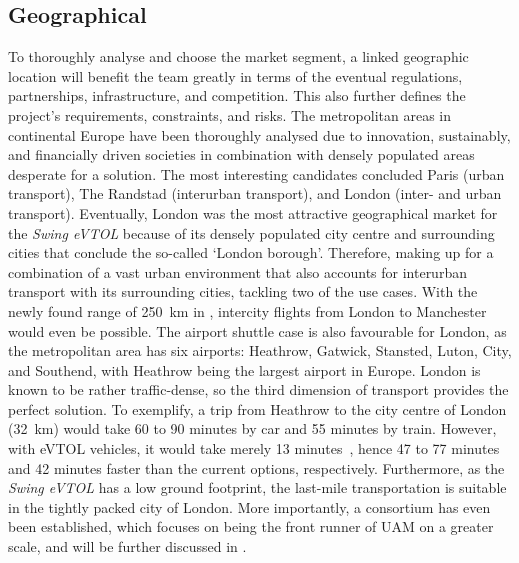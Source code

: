 \subsection*{Geographical}
To thoroughly analyse and choose the market segment, a linked geographic location will benefit the team greatly in terms of the eventual regulations, partnerships, infrastructure, and competition.
This also further defines the project's requirements, constraints, and risks.
The metropolitan areas in continental Europe have been thoroughly analysed due to innovation, sustainably, and financially driven societies in combination with densely populated areas desperate for a solution.
The most interesting candidates concluded Paris (urban transport), The Randstad (interurban transport), and London (inter- and urban transport).
Eventually, London was the most attractive geographical market for the \textit{Swing eVTOL} because of its densely populated city centre and surrounding cities that conclude the so-called \enquote*{London borough}.
Therefore, making up for a combination of a vast urban environment that also accounts for interurban transport with its surrounding cities, tackling two of the use cases.
With the newly found range of \qty{250}{\km} in , intercity flights from London to Manchester would even be possible.
The airport shuttle case is also favourable for London, as the metropolitan area has six airports: Heathrow, Gatwick, Stansted, Luton, City, and Southend, with Heathrow being the largest airport in Europe.
London is known to be rather traffic-dense, so the third dimension of transport provides the perfect solution.
To exemplify, a trip from Heathrow to the city centre of London (\qty{32}{km}) would take 60 to 90 minutes by car and 55 minutes by train.
However, with eVTOL vehicles, it would take merely 13 minutes~\cite{UKAMC2022benefits}, hence 47 to 77 minutes and 42 minutes faster than the current options, respectively.
Furthermore, as the \textit{Swing eVTOL} has a low ground footprint, the last-mile transportation is suitable in the tightly packed city of London.
More importantly, a consortium has even been established, which focuses on being the front runner of UAM on a greater scale, and will be further discussed in .


